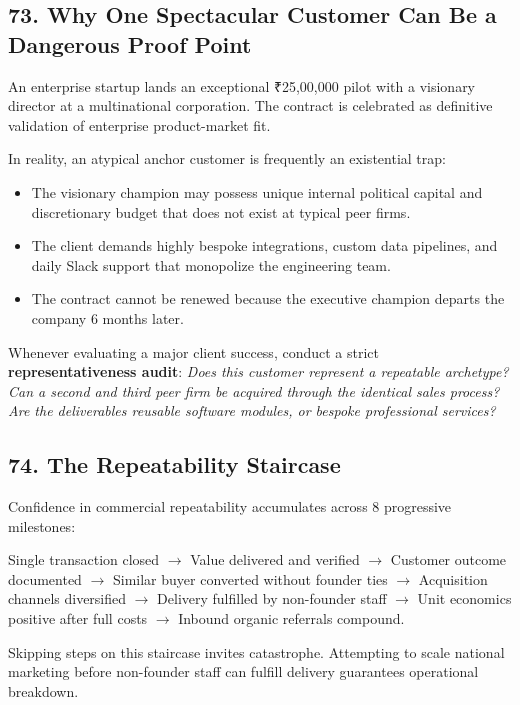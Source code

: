 \subsection*{73. Why One Spectacular Customer Can Be a Dangerous Proof Point}

An enterprise startup lands an exceptional ₹25,00,000 pilot with a visionary director at a multinational corporation. The contract is celebrated as definitive validation of enterprise product-market fit.

In reality, an atypical anchor customer is frequently an existential trap:
\begin{itemize}
    \item The visionary champion may possess unique internal political capital and discretionary budget that does not exist at typical peer firms.
    \item The client demands highly bespoke integrations, custom data pipelines, and daily Slack support that monopolize the engineering team.
    \item The contract cannot be renewed because the executive champion departs the company 6 months later.
\end{itemize}

Whenever evaluating a major client success, conduct a strict \textbf{representativeness audit}: \emph{Does this customer represent a repeatable archetype? Can a second and third peer firm be acquired through the identical sales process? Are the deliverables reusable software modules, or bespoke professional services?}

\subsection*{74. The Repeatability Staircase}

Confidence in commercial repeatability accumulates across 8 progressive milestones:

\begin{center}
Single transaction closed $\rightarrow$ Value delivered and verified $\rightarrow$ Customer outcome documented $\rightarrow$ Similar buyer converted without founder ties $\rightarrow$ Acquisition channels diversified $\rightarrow$ Delivery fulfilled by non-founder staff $\rightarrow$ Unit economics positive after full costs $\rightarrow$ Inbound organic referrals compound.
\end{center}

Skipping steps on this staircase invites catastrophe. Attempting to scale national marketing before non-founder staff can fulfill delivery guarantees operational breakdown.

